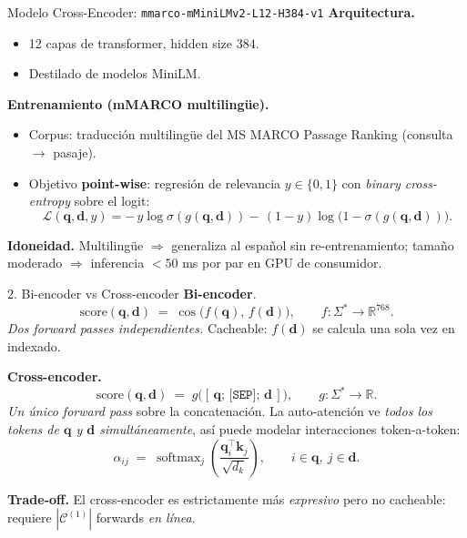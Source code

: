 \documentclass[10pt,aspectratio=169]{beamer}
\newcommand{\vq}{\mathbf{q}}
\newcommand{\vd}{\mathbf{d}}
\newcommand{\R}{\mathbb{R}}
\newcommand{\T}{^{\!\top}}
\DeclareMathOperator{\softmax}{softmax}
\begin{document}
\begin{frame}{Modelo Cross-Encoder: \texttt{mmarco-mMiniLMv2-L12-H384-v1}}
	\textbf{Arquitectura.}
	\begin{itemize}
		\item 12 capas de transformer, hidden size $384$.
		\item Destilado de modelos MiniLM.
	\end{itemize}

	\textbf{Entrenamiento (mMARCO multilingüe).}
	\begin{itemize}
		\item Corpus: traducción multilingüe del MS MARCO Passage Ranking
		      (consulta $\to$ pasaje).
		\item Objetivo \textbf{point-wise}: regresión de relevancia
		      $y\in\{0,1\}$ con \emph{binary cross-entropy} sobre el logit:
		      \[
			      \mathcal{L}(\vq,\vd,y) =
			      -\,y \log \sigma(g(\vq,\vd))
			      -\,(1-y)\log\bigl(1-\sigma(g(\vq,\vd))\bigr).
		      \]
	\end{itemize}

	\textbf{Idoneidad.} Multilingüe $\Rightarrow$ generaliza al español
	sin re-entrenamiento; tamaño moderado $\Rightarrow$
	inferencia $< 50$ ms por par en GPU de consumidor.
\end{frame}

\begin{frame}{2. Bi-encoder vs Cross-encoder}
	\textbf{Bi-encoder}.
	\[
		\text{score}(\vq,\vd) \;=\; \cos\bigl(f(\vq),\, f(\vd)\bigr),
		\qquad
		f:\Sigma^{*} \to \R^{768}.
	\]
	\emph{Dos forward passes independientes.} Cacheable: $f(\vd)$ se
	calcula una sola vez en indexado.

	\bigskip
	\textbf{Cross-encoder.}
	\[
		\text{score}(\vq,\vd) \;=\;
		g\bigl([\,\vq;\, \texttt{[SEP]};\, \vd\,]\bigr),
		\qquad
		g:\Sigma^{*} \to \R.
	\]
	\emph{Un único forward pass} sobre la concatenación. La auto-atención
	ve \emph{todos los tokens de $\vq$ y $\vd$ simultáneamente}, así puede
	modelar interacciones token-a-token:
	\[
		\alpha_{ij} \;=\;
		\softmax_{j}\!\left(
		\frac{\mathbf{q}_i\T \mathbf{k}_j}{\sqrt{d_k}}
		\right),
		\qquad
		i \in \vq,\ j \in \vd.
	\]

	\textbf{Trade-off.} El cross-encoder es estrictamente más
	\emph{expresivo} pero no cacheable: requiere $|\mathcal{C}^{(1)}|$
	forwards \emph{en línea}.
\end{frame}
\end{document}
